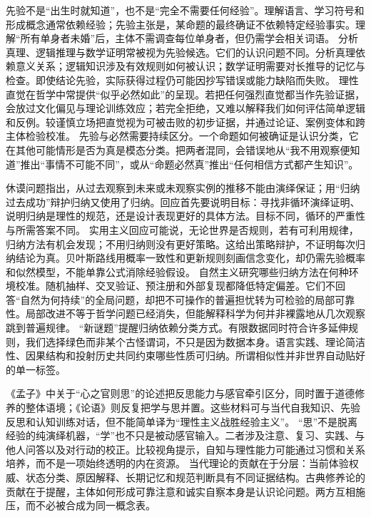 先验不是“出生时就知道”，也不是“完全不需要任何经验”。理解语言、学习符号和形成概念通常依赖经验；先验主张是，某命题的最终确证不依赖特定经验事实。理解“所有单身者未婚”后，主体不需调查每位单身者，但仍需学会相关词语。 分析真理、逻辑推理与数学证明常被视为先验候选。它们的认识问题不同。分析真理依赖意义关系；逻辑知识涉及有效规则如何被认识；数学证明需要对长推导的记忆与检查。即使结论先验，实际获得过程仍可能因抄写错误或能力缺陷而失败。 理性直觉在哲学中常提供“似乎必然如此”的呈现。若把任何强烈直觉都当作先验证据，会放过文化偏见与理论训练效应；若完全拒绝，又难以解释我们如何评估简单逻辑和反例。较谨慎立场把直觉视为可被击败的初步证据，并通过论证、案例变体和跨主体检验校准。 先验与必然需要持续区分。一个命题如何被确证是认识分类，它在其他可能情形是否为真是模态分类。把两者混同，会错误地从“我不用观察便知道”推出“事情不可能不同”，或从“命题必然真”推出“任何相信方式都产生知识”。

休谟问题指出，从过去观察到未来或未观察实例的推移不能由演绎保证；用“归纳过去成功”辩护归纳又使用了归纳\parencite{hume2000}。回应首先要说明目标：寻找非循环演绎证明、说明归纳是理性的规范，还是设计表现更好的具体方法。目标不同，循环的严重性与所需答案不同。 实用主义回应可能说，无论世界是否规则，若有可利用规律，归纳方法有机会发现；不用归纳则没有更好策略。这给出策略辩护，不证明每次归纳结论为真。贝叶斯路线用概率一致性和更新规则刻画信念变化，却仍需先验概率和似然模型，不能单靠公式消除经验假设。 自然主义研究哪些归纳方法在何种环境校准。随机抽样、交叉验证、预注册和外部复现都降低特定偏差。它们不回答“自然为何持续”的全局问题，却把不可操作的普遍担忧转为可检验的局部可靠性。局部改进不等于哲学问题已经消失，但能解释科学为何并非裸露地从几次观察跳到普遍规律。 “新谜题”提醒归纳依赖分类方式。有限数据同时符合许多延伸规则，我们选择绿色而非某个古怪谓词，不只是因为数据本身。语言实践、理论简洁性、因果结构和投射历史共同约束哪些性质可归纳。所谓相似性并非世界自动贴好的单一标签。

《孟子》中关于“心之官则思”的论述把反思能力与感官牵引区分，同时置于道德修养的整体语境\parencite{mencius2008}；《论语》则反复把学与思并置\parencite{analects2003}。这些材料可与当代自我知识、先验反思和认知训练对话，但不能简单译为“理性主义战胜经验主义”。 “思”不是脱离经验的纯演绎机器，“学”也不只是被动感官输入。二者涉及注意、复习、实践、与他人问答以及对行动的校正。比较视角提示，自知与理性能力可能通过习惯和关系培养，而不是一项始终透明的内在资源。 当代理论的贡献在于分层：当前体验权威、状态分类、原因解释、长期记忆和规范判断具有不同证据结构。古典修养论的贡献在于提醒，主体如何形成可靠注意和诚实自察本身是认识论问题。两方互相施压，而不必被合成为同一概念表。

